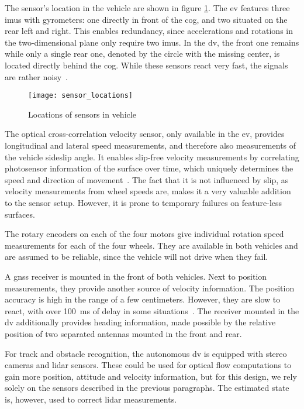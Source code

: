 The sensor's location in the vehicle are shown in figure \ref{fig:sensor-locations}. The \gls{ev} features three \glspl{imu} with gyrometers: one directly in front of the \gls{cog}, and two situated on the rear left and right. This enables redundancy, since accelerations and rotations in the two-dimensional plane only require two \glspl{imu}. In the \gls{dv}, the front one remains while only a single rear one, denoted by the circle with the missing center, is located directly behind the \gls{cog}. While these sensors react very fast, the signals are rather noisy~\cite[p.~19~ff.]{Biel.2019}.

\begin{figure}
	\centering
	\texttt{[image: sensor\_locations]}%
	\caption{Locations of sensors in vehicle}
	\label{fig:sensor-locations}
\end{figure}

The optical cross-correlation velocity sensor, only available in the \gls{ev}, provides longitudinal and lateral speed measurements, and therefore also measurements of the vehicle sideslip angle. It enables slip-free velocity measurements by correlating photosensor information of the surface over time, which uniquely determines the speed and direction of movement~\cite{Bellof.4241993}. The fact that it is not influenced by slip, as velocity measurements from wheel speeds are, makes it a very valuable addition to the sensor setup. However, it is prone to temporary failures on feature-less surfaces.

The rotary encoders on each of the four motors give individual rotation speed measurements for each of the four wheels. They are available in both vehicles and are assumed to be reliable, since the vehicle will not drive when they fail.

A \gls{gnss} receiver is mounted in the front of both vehicles. Next to position measurements, they provide another source of velocity information. The position accuracy is high in the range of a few centimeters. However, they are slow to react, with over \SI{100}{\milli\second} of delay in some situations~\cite[p.~27]{Biel.2019}. The receiver mounted in the \gls{dv} additionally provides heading information, made possible by the relative position of two separated antennas mounted in the front and rear.

For track and obstacle recognition, the autonomous \gls{dv} is equipped with stereo cameras and lidar sensors. These could be used for optical flow computations to gain more position, attitude and velocity information, but for this design, we rely solely on the sensors described in the previous paragraphs. The estimated state is, however, used to correct lidar measurements.


